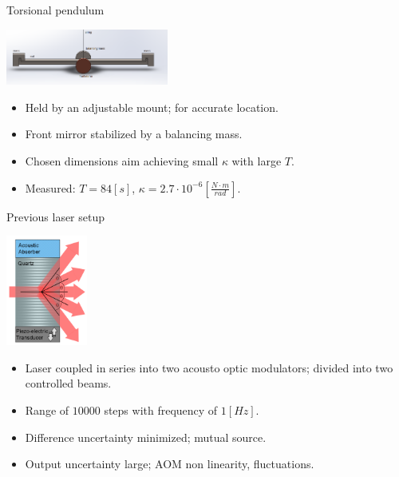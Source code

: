 \documentclass{beamer}
\begin{document}
\begin{frame}{Torsional pendulum}
	\begin{center}		
		\includegraphics[width=0.4\textwidth,keepaspectratio]{pendulum_front_names.png}
	\end{center}
	\begin{itemize}
		\item Held by an adjustable mount; for accurate location. 
		\item Front mirror stabilized by a balancing mass.		
		\item Chosen dimensions aim achieving small $\kappa$ with large $T$.
		\item Measured: $T = 84[s]$, $\kappa = 2.7\cdot10^{-6}[\frac{N\cdot m}{rad}]$.
	\end{itemize}
	
\end{frame}

\begin{frame}{Previous laser setup}
	\begin{center}		
		\includegraphics[width=0.2\textwidth,keepaspectratio]{aom.png}
	\end{center}
	\begin{itemize}		
		\item Laser coupled in series into two acousto optic modulators; divided into two controlled beams.
		\item Range of $10000$ steps with frequency of $1 [Hz]$.
		\item Difference uncertainty minimized; mutual source.
		\item Output uncertainty large; AOM non linearity, fluctuations.
	\end{itemize}
\end{frame}
\end{document}
